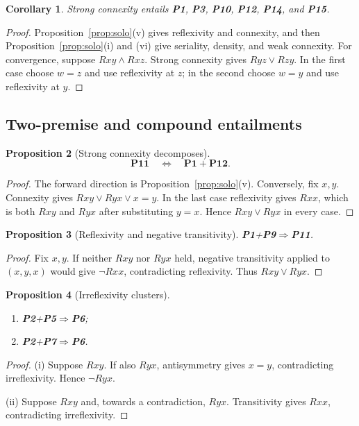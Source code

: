 \documentclass[11pt,a4paper,reqno]{amsart}
\newtheorem{proposition}{Proposition}[section]
\newtheorem{corollary}[proposition]{Corollary}
\theoremstyle{definition}
\theoremstyle{remark}
\newcommand{\prop}[1]{\textbf{P#1}}
\newcommand{\catentails}{\Rightarrow}
\newcommand{\catequiv}{\Longleftrightarrow}
\begin{document}
\begin{corollary}\label{cor:p11closure}
Strong connexity entails \prop{1}, \prop{3}, \prop{10}, \prop{12}, \prop{14},
and \prop{15}.
\end{corollary}
\begin{proof}
Proposition~\ref{prop:solo}(v) gives reflexivity and connexity, and then
Proposition~\ref{prop:solo}(i) and (vi) give seriality, density, and weak
connexity.  For convergence, suppose $Rxy\wedge Rxz$.  Strong connexity gives
$Ryz\vee Rzy$.  In the first case choose $w=z$ and use reflexivity at $z$; in
the second choose $w=y$ and use reflexivity at $y$.
\end{proof}

\subsection{Two-premise and compound entailments}

\begin{proposition}[Strong connexity decomposes]\label{prop:p1p12p11}
\[
\prop{11}\quad\catequiv\quad \prop{1}+\prop{12}.
\]
\end{proposition}
\begin{proof}
The forward direction is Proposition~\ref{prop:solo}(v).  Conversely, fix
$x,y$.  Connexity gives $Rxy\vee Ryx\vee x=y$.  In the last case reflexivity
gives $Rxx$, which is both $Rxy$ and $Ryx$ after substituting $y=x$.  Hence
$Rxy\vee Ryx$ in every case.
\end{proof}

\begin{proposition}[Reflexivity and negative transitivity]\label{prop:p1p9}
\prop{1}+\prop{9}$\catentails$\prop{11}.
\end{proposition}
\begin{proof}
Fix $x,y$.  If neither $Rxy$ nor $Ryx$ held, negative transitivity applied to
$(x,y,x)$ would give $\neg Rxx$, contradicting reflexivity.  Thus
$Rxy\vee Ryx$.
\end{proof}

\begin{proposition}[Irreflexivity clusters]\label{prop:irr-clusters}
\begin{enumerate}[label=(\roman*),noitemsep]
\item \prop{2}+\prop{5}$\catentails$\prop{6};
\item \prop{2}+\prop{7}$\catentails$\prop{6}.
\end{enumerate}
\end{proposition}
\begin{proof}
(i) Suppose $Rxy$.  If also $Ryx$, antisymmetry gives $x=y$, contradicting
irreflexivity.  Hence $\neg Ryx$.

(ii) Suppose $Rxy$ and, towards a contradiction, $Ryx$.  Transitivity gives
$Rxx$, contradicting irreflexivity.
\end{proof}
\end{document}
